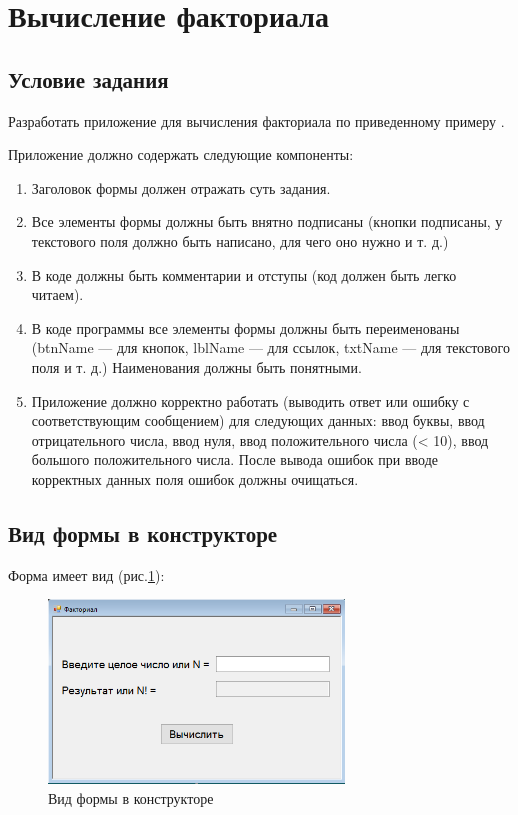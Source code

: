 \section{Вычисление факториала}

\subsection{Условие задания}

Разработать приложение для вычисления факториала по приведенному примеру \cite{cite2}.

Приложение должно содержать следующие компоненты:

\begin{enumerate}
    \item{Заголовок формы должен отражать суть задания.}
    \item{Все элементы формы должны быть внятно подписаны (кнопки подписаны, у текстового поля должно быть написано, для чего оно нужно и т. д.)}
    \item{В коде должны быть комментарии и отступы (код должен быть легко читаем).}
    \item{В коде программы все элементы формы должны быть переименованы (btnName --- для кнопок, lblName --- для ссылок, txtName --- для текстового поля и т. д.) Наименования должны быть понятными.}
    \item{Приложение должно корректно работать (выводить ответ или ошибку с соответствующим сообщением) для следующих данных: ввод буквы, ввод отрицательного числа, ввод нуля, ввод положительного числа (< 10), ввод большого положительного числа. После вывода ошибок при вводе корректных данных поля ошибок должны очищаться.}
\end{enumerate}

\subsection{Вид формы в конструкторе}

Форма имеет вид (рис.\ref{fig:FormInConstruct1}):

\begin{figure}[!h]
    \centering
    \includegraphics[width = 0.7\textwidth]{images/Task1/FormInConstructor.png}
    \caption{Вид формы в конструкторе}
    \label{fig:FormInConstruct1}
\end{figure}

